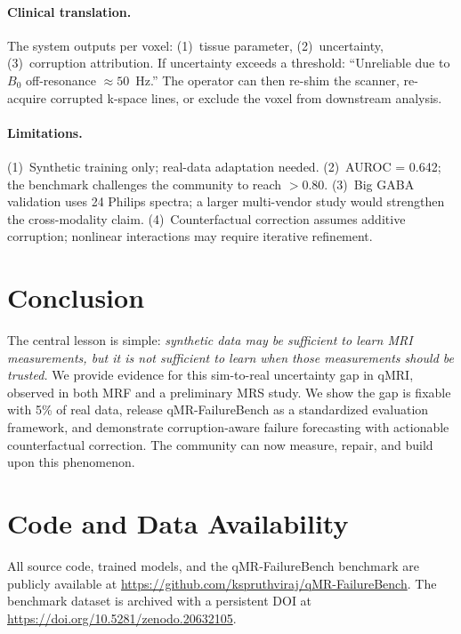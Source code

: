 \documentclass[11pt,a4paper]{article}
\begin{document}
\paragraph{Clinical translation.}
The system outputs per voxel: (1)~tissue parameter, (2)~uncertainty, (3)~corruption attribution. If uncertainty exceeds a threshold: ``Unreliable due to $B_0$ off-resonance $\approx 50$~Hz.'' The operator can then re-shim the scanner, re-acquire corrupted k-space lines, or exclude the voxel from downstream analysis.

\paragraph{Limitations.}
(1)~Synthetic training only; real-data adaptation needed. (2)~AUROC = 0.642; the benchmark challenges the community to reach $>0.80$. (3)~Big GABA validation uses 24 Philips spectra; a larger multi-vendor study would strengthen the cross-modality claim. (4)~Counterfactual correction assumes additive corruption; nonlinear interactions may require iterative refinement.

\section{Conclusion}

The central lesson is simple: \emph{synthetic data may be sufficient to learn MRI measurements, but it is not sufficient to learn when those measurements should be trusted.} We provide evidence for this sim-to-real uncertainty gap in qMRI, observed in both MRF and a preliminary MRS study. We show the gap is fixable with 5\% of real data, release qMR-FailureBench as a standardized evaluation framework, and demonstrate corruption-aware failure forecasting with actionable counterfactual correction. The community can now measure, repair, and build upon this phenomenon.

\section*{Code and Data Availability}

All source code, trained models, and the qMR-FailureBench benchmark are publicly available at \url{https://github.com/kspruthviraj/qMR-FailureBench}. The benchmark dataset is archived with a persistent DOI at \url{https://doi.org/10.5281/zenodo.20632105}.
\end{document}
